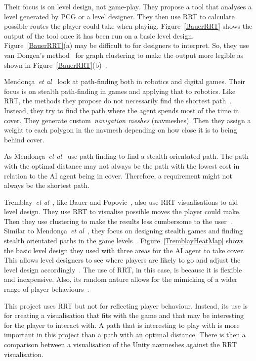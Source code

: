 \documentclass[journal]{IEEEtran}
\begin{document}
	Their focus is on level design, not game-play. They propose a tool that analyses a level generated by PCG or a level designer. They then use RRT to calculate possible routes the player could take when playing.  Figure~\ref{BauerRRT} shows the output of the tool once it has been run on a basic level design.  Figure~\ref{BauerRRT}(a)  may be difficult to for designers to interpret. So, they use van Dongen's method~\cite{Dongen2001} for graph clustering to make the output more legible as shown in Figure~\ref{BauerRRT}(b)~\cite{bauer2012}.  
	
	Mendonça~\textit{et al}~\cite{Mendonça2015} look at path-finding both in robotics and digital games. Their focus is on stealth path-finding in games and applying that to robotics. Like RRT, the methods they propose do not necessarily find the shortest path~\cite{karaman2010, Mendonça2015}. Instead, they try to find the path where the agent spends most of the time in cover. They generate custom~\textit{navigation meshes} (navmeshes). Then they assign a weight to each polygon in the navmesh depending on how close it is to being behind cover. 
	
	As Mendonça~\textit{et al}~\cite{Mendonça2015} use path-finding to find a stealth orientated path. The path with the optimal distance may not always be the path with the lowest cost in relation to the AI agent being in cover. Therefore, a requirement might not always be the shortest path. 
	
	Tremblay~\textit{et al}~\cite{Tremblay2013}, like Bauer and Popovic~\cite{bauer2012}, also use RRT visualisations to aid level design. They use RRT to visualise possible moves the player could make. Then they use clustering to make the results less cumbersome to the user~\cite{Tremblay2013}. Similar to Mendonça~\textit{et al}~\cite{Mendonça2015}, they focus on designing stealth games and finding stealth orientated paths in the game levels~\cite{Tremblay2013}.   Figure~\ref{TremblayHeatMap} shows the basic level design they used with three areas for the AI agent to take cover. This allows level designers to see where players are likely to go and adjust the level design accordingly~\cite{Tremblay2013}.  The use of RRT, in this case, is because it is flexible and inexpensive. Also, its random nature allows for the mimicking of a wider range of player behaviours~\cite{Tremblay2013}. 
	
	This project uses RRT but not for reflecting player behaviour.  Instead, its use is for creating a visualisation that fits with the game and that may be interesting for the player to interact with. A path that is interesting to play with is more important in this project than a path with an optimal distance. There is then a comparison between a visualisation of the Unity navmeshes against the RRT visualisation.
	
\end{document}
